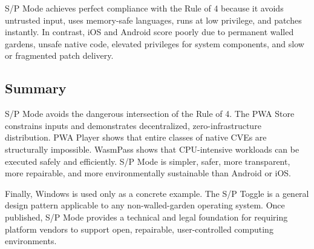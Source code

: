 \begin{table}[h]
\centering


\vspace{1.5em} %

\caption{Rule-of-4 comparison across platforms.}
\end{table}

S/P Mode achieves perfect compliance with the Rule of 4 because it avoids untrusted input, uses memory-safe languages, runs at low privilege, and patches instantly. In contrast, iOS and Android score poorly due to permanent walled gardens, unsafe native code, elevated privileges for system components, and slow or fragmented patch delivery.

\subsection{Summary}

S/P Mode avoids the dangerous intersection of the Rule of 4. The PWA Store constrains inputs and demonstrates decentralized, zero-infrastructure distribution. PWA Player shows that entire classes of native CVEs are structurally impossible. WasmPass shows that CPU-intensive workloads can be executed safely and efficiently. S/P Mode is simpler, safer, more transparent, more repairable, and more environmentally sustainable than Android or iOS.

Finally, Windows is used only as a concrete example. The S/P Toggle is a general design pattern applicable to any non-walled-garden operating system. Once published, S/P Mode provides a technical and legal foundation for requiring platform vendors to support open, repairable, user-controlled computing environments.
